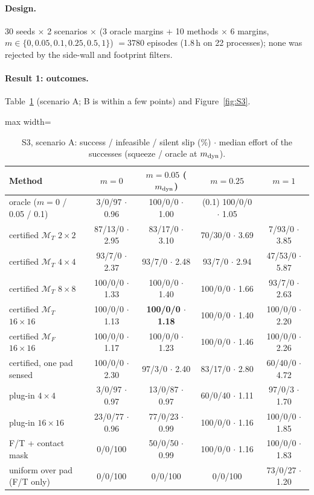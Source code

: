 \documentclass[11pt,a4paper]{article}
\newcommand{\M}{\mathcal M}
\begin{document}
\paragraph{Design.} 30 seeds $\times$ 2 scenarios $\times$ (3 oracle margins + 10 methods $\times$ 6 margins,
$m\in\{0,0.05,0.1,0.25,0.5,1\}$) $=3780$ episodes (1.8\,h on 22 processes); none was rejected by the side-wall and footprint filters.

\paragraph{Result 1: outcomes.} Table~\ref{tab:S3} (scenario A; B is within a few points) and Figure~\ref{fig:S3}.

\begin{table}[tbp]
\centering\small
\begin{adjustbox}{max width=\linewidth}\begin{tabular}{@{}lcccc@{}}
\toprule
Method & $m=0$ & $m=0.05$ ($m_{\rm dyn}$) & $m=0.25$ & $m=1$ \\
\midrule
oracle ($m=0$ / 0.05 / 0.1) & 3/0/97 $\cdot$ 0.96 & 100/0/0 $\cdot$ 1.00 & (0.1) 100/0/0 $\cdot$ 1.05 & \\
certified $\M_T$ $2\times2$ & 87/13/0 $\cdot$ 2.95 & 83/17/0 $\cdot$ 3.10 & 70/30/0 $\cdot$ 3.69 & 7/93/0 $\cdot$ 3.85 \\
certified $\M_T$ $4\times4$ & 93/7/0 $\cdot$ 2.37 & 93/7/0 $\cdot$ 2.48 & 93/7/0 $\cdot$ 2.94 & 47/53/0 $\cdot$ 5.87 \\
certified $\M_T$ $8\times8$ & 100/0/0 $\cdot$ 1.33 & 100/0/0 $\cdot$ 1.40 & 100/0/0 $\cdot$ 1.66 & 93/7/0 $\cdot$ 2.63 \\
certified $\M_T$ $16\times16$ & 100/0/0 $\cdot$ 1.13 & \textbf{100/0/0 $\cdot$ 1.18} & 100/0/0 $\cdot$ 1.40 & 100/0/0 $\cdot$ 2.20 \\
certified $\M_F$ $16\times16$ & 100/0/0 $\cdot$ 1.17 & 100/0/0 $\cdot$ 1.23 & 100/0/0 $\cdot$ 1.46 & 100/0/0 $\cdot$ 2.26 \\
certified, one pad sensed & 100/0/0 $\cdot$ 2.30 & 97/3/0 $\cdot$ 2.40 & 83/17/0 $\cdot$ 2.80 & 60/40/0 $\cdot$ 4.72 \\
plug-in $4\times4$ & 3/0/97 $\cdot$ 0.97 & 13/0/87 $\cdot$ 0.97 & 60/0/40 $\cdot$ 1.11 & 97/0/3 $\cdot$ 1.70 \\
plug-in $16\times16$ & 23/0/77 $\cdot$ 0.96 & 77/0/23 $\cdot$ 0.99 & 100/0/0 $\cdot$ 1.16 & 100/0/0 $\cdot$ 1.85 \\
F/T + contact mask & 0/0/100 & 50/0/50 $\cdot$ 0.99 & 100/0/0 $\cdot$ 1.16 & 100/0/0 $\cdot$ 1.83 \\
uniform over pad (F/T only) & 0/0/100 & 0/0/100 & 0/0/100 & 73/0/27 $\cdot$ 1.20 \\
\bottomrule
\end{tabular}\end{adjustbox}
\caption{S3, scenario A: success / infeasible / silent slip (\%) $\cdot$ median effort of the successes (squeeze / oracle at $m_{\rm dyn}$).}
\label{tab:S3}
\end{table}
\end{document}
